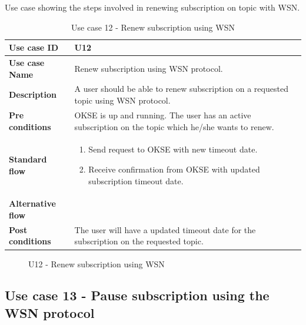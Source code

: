 Use case showing the steps involved in renewing subscription on topic with WSN. 

\begin{table}[ht!]
\centering
\begin{tabular}{|l|p{5cm}|}
\hline
\textbf{Use case ID} & U12 \\ \hline
\textbf{Use case Name} & Renew subscription using WSN protocol.\\ \hline
\textbf{Description} & A user should be able to renew subscription on a requested topic using WSN protocol.\\ \hline
\textbf{Pre conditions} & OKSE is up and running. The user has an active subscription on the topic which he/she wants to renew.\\ \hline
\textbf{Standard flow} & \begin{enumerate}
\item Send request to OKSE with new timeout date. 
\item Receive confirmation from OKSE with updated subscription timeout date.
\end{enumerate} \\ \hline
\textbf{Alternative flow} & \\ \hline
\textbf{Post conditions} & The user will have a updated timeout date for the subscription on the requested topic.\\ \hline
\end{tabular}
\caption{Use case 12 - Renew subscription using WSN}
\label{uc12}
\end{table}

\begin{center}
  \begin{figure}[ht!]
    \caption{U12 - Renew subscription using WSN}
    \label{fig:u12}
  \end{figure}
\end{center}

\clearpage

\subsection{Use case 13 - Pause subscription using the WSN protocol}
\label{subsec:requirements_engineering-use_cases-pause_sub_wsn}

